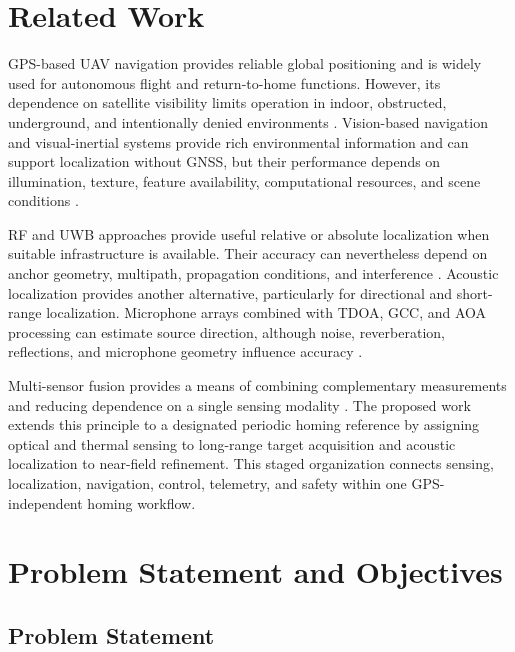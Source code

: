 \documentclass[conference]{IEEEtran}
\begin{document}
\section{Related Work}

GPS-based UAV navigation provides reliable global positioning and is widely
used for autonomous flight and return-to-home functions. However, its
dependence on satellite visibility limits operation in indoor, obstructed,
underground, and intentionally denied environments
\cite{vanegas2016,px4guide,px4return}. Vision-based navigation and
visual-inertial systems provide rich environmental information and can support
localization without GNSS, but their performance depends on illumination,
texture, feature availability, computational resources, and scene conditions
\cite{leutenegger2015,forster2017,orbslam3,faessler2018}.

RF and UWB approaches provide useful relative or absolute localization when
suitable infrastructure is available. Their accuracy can nevertheless depend
on anchor geometry, multipath, propagation conditions, and interference
\cite{zafari2019,liu2014,wang2024}. Acoustic localization provides another
alternative, particularly for directional and short-range localization.
Microphone arrays combined with TDOA, GCC, and AOA processing can estimate
source direction, although noise, reverberation, reflections, and microphone
geometry influence accuracy
\cite{brandstein2001,knapp1976,chen2006,do2010}.

Multi-sensor fusion provides a means of combining complementary measurements
and reducing dependence on a single sensing modality
\cite{welch1995,barshalom2001,gustafsson2012}. The proposed work extends this
principle to a designated periodic homing reference by assigning optical and
thermal sensing to long-range target acquisition and acoustic localization to
near-field refinement. This staged organization connects sensing, localization,
navigation, control, telemetry, and safety within one GPS-independent homing
workflow.


\section{Problem Statement and Objectives}

\subsection{Problem Statement}
\end{document}
